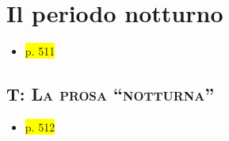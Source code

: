 \documentclass{book}
\newcommand{\pagine}[1]{\colorbox{yellow}{#1}}
\begin{document}
\section{Il periodo notturno}

\begin{itemize}
\item
  \pagine{p. 511}
\end{itemize}

\subsection{T: \textsc{La prosa ``notturna''}}

\begin{itemize}
\item
  \pagine{p. 512}
\end{itemize}
\end{document}

